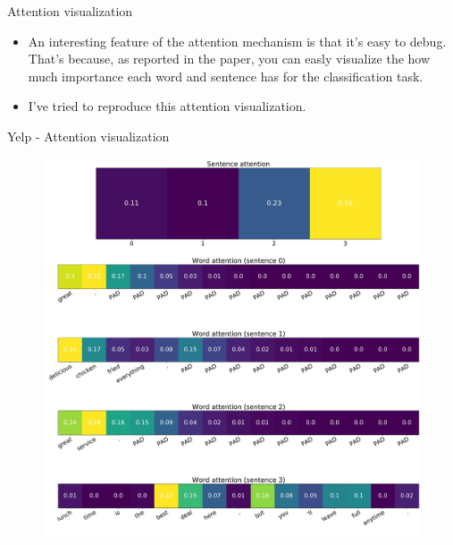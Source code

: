 \documentclass[10pt]{beamer}
\begin{document}


\begin{frame}{Attention visualization}

\begin{itemize}
\item
An interesting feature of the attention mechanism is that it's easy to debug. That's because, as reported in the paper, you can easly visualize the how much importance each word and sentence has for the classification task.
\item
I've tried to reproduce this attention visualization.
\end{itemize}

\end{frame}


\begin{frame}{Yelp - Attention visualization}

\begin{figure}
\centering
\includegraphics[scale=0.15]{img/yelp-han-visual}
\end{figure}

\end{frame}
\end{document}
